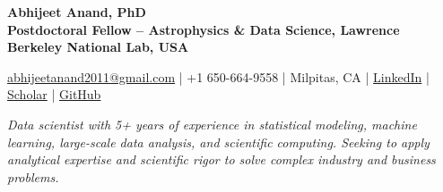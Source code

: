 \documentclass[a4paper,10pt]{article}
\begin{document}
\begin{center}
    {\huge \textbf{Abhijeet Anand, PhD}} \\
    {\normalsize \vspace{1.5mm}
    \textbf{Postdoctoral Fellow – Astrophysics \& Data Science, Lawrence Berkeley National Lab, USA}} 
    \vspace{-1mm}
    \begin{center}
    \normalfont
\href{mailto:abhijeetanand2011@gmail.com}{abhijeetanand2011@gmail.com} \quad | \quad 
    +1 650-664-9558 \quad | \quad Milpitas, CA \quad | \quad 
    \href{https://www.linkedin.com/in/abhijeet-anand-iisc}{LinkedIn} \quad | \quad 
    \href{https://scholar.google.com/citations?hl=en&user=MfOuq1IAAAAJ}{Scholar} \quad | \quad 
    \href{https://github.com/abhi0395}{GitHub}
    \end{center}
\end{center}
\begin{center}
\vspace*{-1.25mm}
\textit{Data scientist with 5+ years of experience in statistical modeling, machine learning, large-scale data analysis, and scientific computing. Seeking to apply analytical expertise and scientific rigor to solve complex industry and business problems.}
\end{center}
\vspace*{-6mm}
\end{document}
